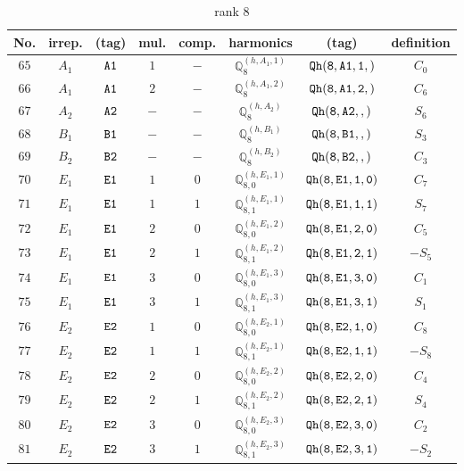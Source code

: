 \documentclass[fleqn,8pt]{jsarticle}
\begin{document}
\begin{table}[ht!]
\begin{center}
\caption{rank 8}
\renewcommand{\arraystretch}{1.3}
\begin{tabular}{cccccccc} \hline \hline
No. & irrep. & (tag) & mul. & comp. & harmonics & (tag) & definition \\ \hline
$ 65 $ & $ A_{1} $ & $ {\tt A1} $ & $ 1 $ & $ - $ & $ \mathbb{Q}_{8}^{(h,A_{1},1)} $ & $ {\tt Qh(8,A1,1,)} $ & $ C_{0} $ \\
$ 66 $ & $ A_{1} $ & $ {\tt A1} $ & $ 2 $ & $ - $ & $ \mathbb{Q}_{8}^{(h,A_{1},2)} $ & $ {\tt Qh(8,A1,2,)} $ & $ C_{6} $ \\
$ 67 $ & $ A_{2} $ & $ {\tt A2} $ & $ - $ & $ - $ & $ \mathbb{Q}_{8}^{(h,A_{2})} $ & $ {\tt Qh(8,A2,,)} $ & $ S_{6} $ \\
$ 68 $ & $ B_{1} $ & $ {\tt B1} $ & $ - $ & $ - $ & $ \mathbb{Q}_{8}^{(h,B_{1})} $ & $ {\tt Qh(8,B1,,)} $ & $ S_{3} $ \\
$ 69 $ & $ B_{2} $ & $ {\tt B2} $ & $ - $ & $ - $ & $ \mathbb{Q}_{8}^{(h,B_{2})} $ & $ {\tt Qh(8,B2,,)} $ & $ C_{3} $ \\
$ 70 $ & $ E_{1} $ & $ {\tt E1} $ & $ 1 $ & $ 0 $ & $ \mathbb{Q}_{8,0}^{(h,E_{1},1)} $ & $ {\tt Qh(8,E1,1,0)} $ & $ C_{7} $ \\
$ 71 $ & $ E_{1} $ & $ {\tt E1} $ & $ 1 $ & $ 1 $ & $ \mathbb{Q}_{8,1}^{(h,E_{1},1)} $ & $ {\tt Qh(8,E1,1,1)} $ & $ S_{7} $ \\
$ 72 $ & $ E_{1} $ & $ {\tt E1} $ & $ 2 $ & $ 0 $ & $ \mathbb{Q}_{8,0}^{(h,E_{1},2)} $ & $ {\tt Qh(8,E1,2,0)} $ & $ C_{5} $ \\
$ 73 $ & $ E_{1} $ & $ {\tt E1} $ & $ 2 $ & $ 1 $ & $ \mathbb{Q}_{8,1}^{(h,E_{1},2)} $ & $ {\tt Qh(8,E1,2,1)} $ & $ - S_{5} $ \\
$ 74 $ & $ E_{1} $ & $ {\tt E1} $ & $ 3 $ & $ 0 $ & $ \mathbb{Q}_{8,0}^{(h,E_{1},3)} $ & $ {\tt Qh(8,E1,3,0)} $ & $ C_{1} $ \\
$ 75 $ & $ E_{1} $ & $ {\tt E1} $ & $ 3 $ & $ 1 $ & $ \mathbb{Q}_{8,1}^{(h,E_{1},3)} $ & $ {\tt Qh(8,E1,3,1)} $ & $ S_{1} $ \\
$ 76 $ & $ E_{2} $ & $ {\tt E2} $ & $ 1 $ & $ 0 $ & $ \mathbb{Q}_{8,0}^{(h,E_{2},1)} $ & $ {\tt Qh(8,E2,1,0)} $ & $ C_{8} $ \\
$ 77 $ & $ E_{2} $ & $ {\tt E2} $ & $ 1 $ & $ 1 $ & $ \mathbb{Q}_{8,1}^{(h,E_{2},1)} $ & $ {\tt Qh(8,E2,1,1)} $ & $ - S_{8} $ \\
$ 78 $ & $ E_{2} $ & $ {\tt E2} $ & $ 2 $ & $ 0 $ & $ \mathbb{Q}_{8,0}^{(h,E_{2},2)} $ & $ {\tt Qh(8,E2,2,0)} $ & $ C_{4} $ \\
$ 79 $ & $ E_{2} $ & $ {\tt E2} $ & $ 2 $ & $ 1 $ & $ \mathbb{Q}_{8,1}^{(h,E_{2},2)} $ & $ {\tt Qh(8,E2,2,1)} $ & $ S_{4} $ \\
$ 80 $ & $ E_{2} $ & $ {\tt E2} $ & $ 3 $ & $ 0 $ & $ \mathbb{Q}_{8,0}^{(h,E_{2},3)} $ & $ {\tt Qh(8,E2,3,0)} $ & $ C_{2} $ \\
$ 81 $ & $ E_{2} $ & $ {\tt E2} $ & $ 3 $ & $ 1 $ & $ \mathbb{Q}_{8,1}^{(h,E_{2},3)} $ & $ {\tt Qh(8,E2,3,1)} $ & $ - S_{2} $ \\
 \hline \hline
\end{tabular}
\end{center}
\end{table}
\end{document}
